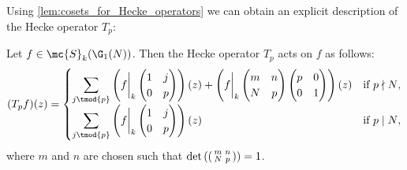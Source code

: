     Using \cref{lem:cosets_for_Hecke_operators} we can obtain an explicit description of the Hecke operator $T_{p}$:

    \begin{proposition}\label{prop:explicit_description_of_Hecke_operators_holomorphic}
      Let $f \in \mc{S}_{k}(\G_{1}(N))$. Then the Hecke operator $T_{p}$ acts on $f$ as follows:
      \[
        (T_{p}f)(z) = \begin{cases} \displaystyle{\sum_{j \tmod{p}}}\left(f\bigg|_{k}\begin{pmatrix} 1 & j \\ 0 & p \end{pmatrix}\right)(z)+\left(f\bigg|_{k}\begin{pmatrix} m & n \\ N & p \end{pmatrix}\begin{pmatrix} p & 0 \\ 0 & 1 \end{pmatrix}\right)(z) & \text{if $p \nmid N$}, \\ \displaystyle{\sum_{j \tmod{p}}}\left(f\bigg|_{k}\begin{pmatrix} 1 & j \\ 0 & p \end{pmatrix}\right)(z) & \text{if $p \mid N$}, \end{cases}
      \]
      where $m$ and $n$ are chosen such that $\det\left(\begin{psmallmatrix} m & n \\ N & p \end{psmallmatrix}\right) = 1$.
    \end{proposition}
